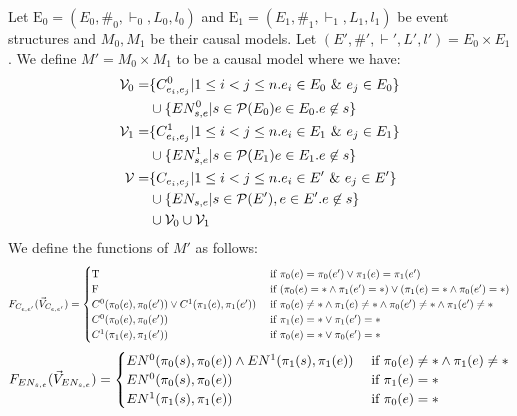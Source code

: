 \begin{definition}
    Let $\mathrm{E}_0 = (E_0,\#_0,\vdash_0,L_0,l_0)$ and
    $\mathrm{E}_1 = (E_1,\#_1,\vdash_1,L_1,l_1)$ be event structures and
    $M_0,M_1$ be their causal models.
    Let $(E',\#',\vdash',L',l') = E_0 \times E_1$.
    We define $M' = M_0 \times M_1$ to be a causal model where we have:
    \begin{align*}
        \mathcal{V}_0 = & \{C_{e_i,e_j}^0 |  1 \leq i < j \leq n.
        e_i \in E_0 \ \& \  e_j \in E_0\}                                 \\
                        & \cup \{EN_{s,e}^0 | s \in \mathcal{P}(E_0)
        e \in E_0. e \not \in s \}                                     \\
        \mathcal{V}_1 = & \{C_{e_i,e_j}^1 |  1 \leq i < j \leq n.
        e_i \in E_1 \ \& \  e_j \in E_1\}                                 \\
                        & \cup \{EN_{s,e}^1 | s \in \mathcal{P}(E_1)
        e \in E_1. e \not \in s \}                                     \\
        \mathcal{V} =   & \{C_{e_i,e_j} |  1 \leq i < j \leq n.
        e_i \in E' \ \& \  e_j \in E'\}                                   \\
                        & \cup \{EN_{s,e} | s \in \mathcal{P}(E'),
        e \in E'. e \not \in s \}                                      \\
                        & \cup \mathcal{V}_0 \cup \mathcal{V}_1
    \end{align*}
    We define the functions of $M'$ as follows:
    $$
        F_{C_{e,e'}}(\vec V_{C_{e,e'}}) = \begin{cases}
            \mathrm{T} & \text{ if } \pi_0(e) = \pi_0(e') \vee \pi_1(e) = \pi_1(e') \\
            \mathrm{F} & \text { if } (\pi_0(e) = * \wedge \pi_1(e') = *)
            \vee (\pi_1(e) = * \wedge \pi_0(e') = *)
            \\
            C^0(\pi_0(e),\pi_0(e')) \vee  C^1(\pi_1(e),\pi_1(e'))
               & \text { if } \pi_0(e) \neq * \wedge \pi_1(e) \neq *
            \wedge \pi_0(e') \neq * \wedge \pi_1(e') \neq *
            \\
            C^0(\pi_0(e),\pi_0(e'))
               & \text { if } \pi_1(e) = * \vee \pi_1(e') = *               \\
            C^1(\pi_1(e),\pi_1(e'))
               & \text { if } \pi_0(e) = * \vee \pi_0(e') = *               \\
        \end{cases}
    $$
    $$
        F_{EN_{s,e}}(\vec V_{EN_{s,e}}) = \begin{cases}
            EN^0(\pi_0(s),\pi_0(e)) \wedge EN^1(\pi_1(s),\pi_1(e))
                                    & \text{ if } \pi_0(e) \neq * \wedge \pi_1(e) \neq * \\
            EN^0(\pi_0(s),\pi_0(e)) & \text{ if } \pi_1(e) = *                           \\
            EN^1(\pi_1(s),\pi_1(e)) & \text{ if } \pi_0(e) = *                           \\
        \end{cases}
    $$
\end{definition}
